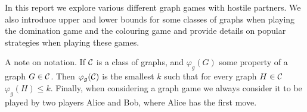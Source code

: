 In this report %
we explore various different graph games with hostile partners. We also introduce upper and lower bounds for some classes of graphs when playing the domination game and the colouring game and provide details on popular strategies when playing these games.






  
    
A note on notation. If $\mathcal{C}$ is a class of graphs, and $\varphi_g(G)$ some property of a graph $G \in \mathcal{C}$. Then $\varphi_g(\mathcal{C})$ is the smallest $k$ such that for every graph $H\in\mathcal{C}$ $\varphi_g(H)\leq k$. Finally, when considering a graph game we always consider it to be played by two players Alice and Bob, where Alice has the first move.     %


    
    
    
    
    
    
    
    
    
    
    
    
    
    
    
    
    
    
    
    
    
